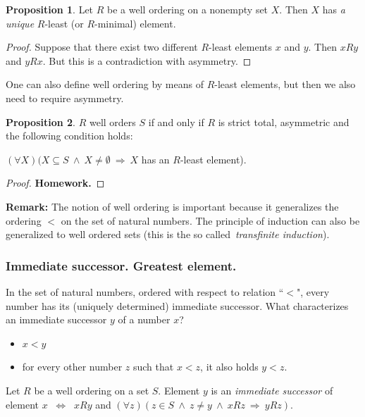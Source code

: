 \documentclass[11pt,paper=b5,footinclude,headinclude]{scrbook} %
\def\inn {{~\wedge~}}
\def\sledi {{~\Rightarrow~}}
\def\cee {{~\Leftrightarrow~}}
\theoremstyle{remark}
\theoremstyle{definition} %
\theoremstyle{theorem} %
\newtheorem*{proposition}{Proposition}
\begin{document}
\begin{proposition}
Let $R$ be a well ordering on a nonempty set $X$. Then
$X$ has {\em a unique} $R$-least (or $R$-minimal) element.
\end{proposition}

\begin{proof}
Suppose that there exist two different $R$-least elements $x$ and $y$.
Then $xRy$ and $yRx$. But this is a contradiction with asymmetry.
\end{proof}

\bigskip
One can also define well ordering by means of $R$-least elements, but then we also need to require asymmetry.

\begin{proposition}
$R$ well orders $S$ if and only if $R$ is strict total, asymmetric and the following condition holds:

$(\forall X)(X\subseteq S\inn X\neq\emptyset\sledi X$ has an $R$-least element).
\end{proposition}

\begin{proof}
\textbf{ Homework.}
\end{proof}

\textbf{ Remark:} The notion of well ordering is important because it generalizes the
ordering $<$ on the set of natural numbers.
The principle of induction can also be generalized to well ordered sets (this is the so called~{\em transfinite induction}).



\medskip
\subsubsection*{Immediate successor. Greatest element.}

In the set of natural numbers, ordered with respect to relation ``$<$", every number has its (uniquely determined) immediate successor.
What characterizes an immediate successor $y$ of a number $x$?
\begin{itemize}
  \item $x<y$
  \item for every other number $z$ such that $x<z$, it also holds $y<z$.
\end{itemize}

\medskip
Let $R$ be a well ordering on a set $S$. Element $y$ is an {\em immediate successor} of element $x$
$\cee$ $xRy$ and $(\forall z)(z\in S\inn z\neq y\inn xRz\sledi yRz)$.
\end{document}
